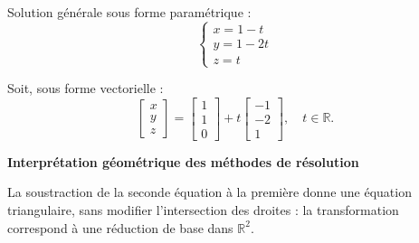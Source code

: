 \documentclass[10pt,a4paper]{article}
\begin{document}
Solution générale sous forme paramétrique :
\[
\begin{cases}
x = 1 - t \\
y = 1 - 2t \\
z = t
\end{cases}
\]

Soit, sous forme vectorielle :
\[
\begin{bmatrix} x \\ y \\ z \end{bmatrix}
=
\begin{bmatrix} 1 \\ 1 \\ 0 \end{bmatrix}
+ t
\begin{bmatrix} -1 \\ -2 \\ 1 \end{bmatrix}, \quad t \in \mathbb{R}.
\]

\bigskip
\textbf{Interprétation géométrique des méthodes de résolution}

\q La soustraction de la seconde équation à la première donne une équation triangulaire, sans modifier l'intersection des droites : la transformation
correspond à une réduction de base dans $\mathbb{R}^2$.
\end{document}
